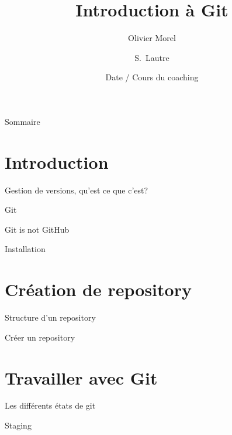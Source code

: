 \documentclass{beamer}
\title{Introduction à Git}
\author
{Olivier Morel \and S.~Lautre}
\date[Version courte]
{Date / Cours du coaching}
\begin{document}
\begin{frame}
	\titlepage
\end{frame}

\begin{frame}{Sommaire}
	\tableofcontents
\end{frame}

\section{Introduction}

\begin{frame}{Gestion de versions, qu'est ce que c'est?}

\end{frame}

\begin{frame}{Git}
	
\end{frame}

\begin{frame}{Git is not GitHub}

\end{frame}

\begin{frame}{Installation}
	
\end{frame}

\section{Création de repository}
\begin{frame}{Structure d'un repository}
	
\end{frame}

\begin{frame}{Créer un repository}
	
\end{frame}

\section{Travailler avec Git}
\begin{frame}{Les différents états de git}
\end{frame}

\begin{frame}{Staging}
	
\end{frame}
\end{document}
